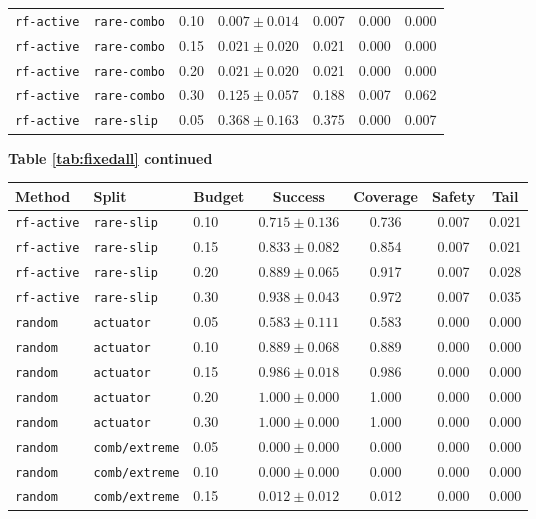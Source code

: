 \documentclass{article}
\begin{document}
\begin{center}
\begin{tabular}{lllcccc}
\texttt{rf-active} & \texttt{rare-combo} & 0.10 & $0.007 \pm 0.014$ & 0.007 & 0.000 & 0.000 \\
\texttt{rf-active} & \texttt{rare-combo} & 0.15 & $0.021 \pm 0.020$ & 0.021 & 0.000 & 0.000 \\
\texttt{rf-active} & \texttt{rare-combo} & 0.20 & $0.021 \pm 0.020$ & 0.021 & 0.000 & 0.000 \\
\texttt{rf-active} & \texttt{rare-combo} & 0.30 & $0.125 \pm 0.057$ & 0.188 & 0.007 & 0.062 \\
\texttt{rf-active} & \texttt{rare-slip} & 0.05 & $0.368 \pm 0.163$ & 0.375 & 0.000 & 0.007 \\
\bottomrule
\end{tabular}
\end{center}
\begin{center}
\textbf{Table \ref{tab:fixedall} continued}\\[0.4ex]
\begin{tabular}{lllcccc}
\toprule
Method & Split & Budget & Success & Coverage & Safety & Tail \\
\midrule
\texttt{rf-active} & \texttt{rare-slip} & 0.10 & $0.715 \pm 0.136$ & 0.736 & 0.007 & 0.021 \\
\texttt{rf-active} & \texttt{rare-slip} & 0.15 & $0.833 \pm 0.082$ & 0.854 & 0.007 & 0.021 \\
\texttt{rf-active} & \texttt{rare-slip} & 0.20 & $0.889 \pm 0.065$ & 0.917 & 0.007 & 0.028 \\
\texttt{rf-active} & \texttt{rare-slip} & 0.30 & $0.938 \pm 0.043$ & 0.972 & 0.007 & 0.035 \\
\texttt{random} & \texttt{actuator} & 0.05 & $0.583 \pm 0.111$ & 0.583 & 0.000 & 0.000 \\
\texttt{random} & \texttt{actuator} & 0.10 & $0.889 \pm 0.068$ & 0.889 & 0.000 & 0.000 \\
\texttt{random} & \texttt{actuator} & 0.15 & $0.986 \pm 0.018$ & 0.986 & 0.000 & 0.000 \\
\texttt{random} & \texttt{actuator} & 0.20 & $1.000 \pm 0.000$ & 1.000 & 0.000 & 0.000 \\
\texttt{random} & \texttt{actuator} & 0.30 & $1.000 \pm 0.000$ & 1.000 & 0.000 & 0.000 \\
\texttt{random} & \texttt{comb/extreme} & 0.05 & $0.000 \pm 0.000$ & 0.000 & 0.000 & 0.000 \\
\texttt{random} & \texttt{comb/extreme} & 0.10 & $0.000 \pm 0.000$ & 0.000 & 0.000 & 0.000 \\
\texttt{random} & \texttt{comb/extreme} & 0.15 & $0.012 \pm 0.012$ & 0.012 & 0.000 & 0.000 \\

\end{tabular}
\end{center}
\end{document}
